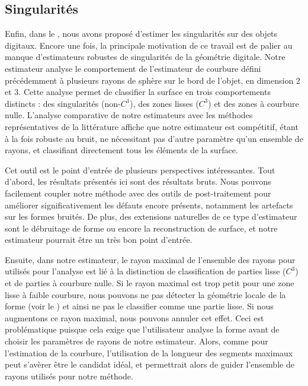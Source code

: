\subsection*{Singularités}
%
Enfin, dans le , nous avons proposé d'estimer les
singularités sur des objets digitaux. Encore une fois, la principale motivation
de ce travail est de palier au manque d'estimateurs robustes de singularités de
la géométrie digitale. Notre estimateur analyse le comportement de l'estimateur
de courbure défini précédemment à plusieurs rayons de sphère sur le bord de
l'objet, en dimension 2 et 3. Cette analyse permet de classifier la surface en
trois comportements distincts : des singularités (non-$C^1$), des zones lisses
($C^3$) et des zones à courbure nulle. L'analyse comparative de notre
estimateurs avec les méthodes représentatives de la littérature affiche que
notre estimateur est compétitif, étant à la fois robuste au bruit, ne
nécessitant pas d'autre paramètre qu'un ensemble de rayons, et classifiant
directement tous les éléments de la surface.


Cet outil est le point d'entrée de plusieurs perspectives intéressantes. Tout
d'abord, les résultats présentés ici sont des résultats bruts. Nous pouvons
facilement coupler notre méthode avec des outils de post-traitement pour
améliorer significativement les défauts encore présents, notamment les artefacts
sur les formes bruités. De plus, des extensions naturelles de ce type
d'estimateur sont le débruitage de forme ou encore la reconstruction de surface,
et notre estimateur pourrait être un très bon point d'entrée.


Ensuite, dans notre estimateur, le rayon maximal de l'ensemble des rayons pour
utilisés pour l'analyse est lié à la distinction de classification de parties
lisse ($C^3$) et de parties à courbure nulle. Si le rayon maximal est trop petit
pour une zone lisse à faible courbure, nous pouvons ne pas détecter la géométrie
locale de la forme (voir le ) et
ainsi ne pas le classifier comme une partie lisse. Si nous augmentons ce rayon
maximal, nous pouvons annuler cet effet. Ceci est problématique puisque cela
exige que l'utilisateur analyse la forme avant de choisir les paramètres de
rayons de notre estimateur. Alors, comme pour l'estimation de la courbure,
l'utilisation de la longueur des segments maximaux peut s'avèrer être le
candidat idéal, et permettrait alors de guider l'ensemble de rayons utilisés
pour notre méthode.


